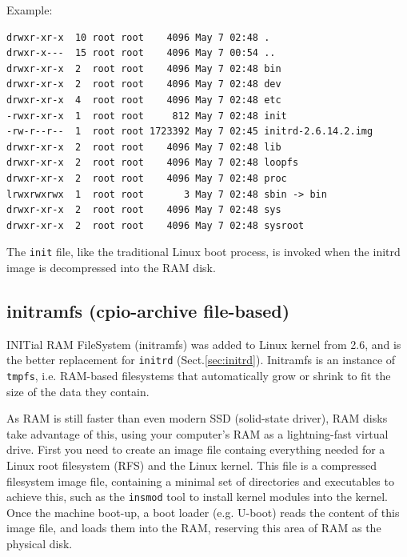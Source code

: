 Example: 
\begin{verbatim}
drwxr-xr-x  10 root root    4096 May 7 02:48 .
drwxr-x---  15 root root    4096 May 7 00:54 ..
drwxr-xr-x  2  root root    4096 May 7 02:48 bin
drwxr-xr-x  2  root root    4096 May 7 02:48 dev
drwxr-xr-x  4  root root    4096 May 7 02:48 etc
-rwxr-xr-x  1  root root     812 May 7 02:48 init
-rw-r--r--  1  root root 1723392 May 7 02:45 initrd-2.6.14.2.img
drwxr-xr-x  2  root root    4096 May 7 02:48 lib
drwxr-xr-x  2  root root    4096 May 7 02:48 loopfs
drwxr-xr-x  2  root root    4096 May 7 02:48 proc
lrwxrwxrwx  1  root root       3 May 7 02:48 sbin -> bin
drwxr-xr-x  2  root root    4096 May 7 02:48 sys
drwxr-xr-x  2  root root    4096 May 7 02:48 sysroot
\end{verbatim}
The \verb!init! file, like the traditional Linux boot process, is invoked when
the initrd image is decompressed into the RAM disk. 

%   

\subsection{initramfs (cpio-archive file-based)}
\label{sec:initramfs}

INITial RAM FileSystem (initramfs) was added to Linux kernel from 2.6, and is
the better replacement for \verb!initrd! (Sect.\ref{sec:initrd}).
Initramfs is an instance of \verb!tmpfs!, i.e. RAM-based filesystems that
automatically grow or shrink to fit the size of the data they contain.

\begin{mdframed}
As RAM is still faster than even modern SSD (solid-state driver), RAM disks take
advantage of this, using your computer's RAM as a lightning-fast virtual drive.
First you need to create an image file containg everything needed for a Linux
root filesystem (RFS) and the Linux kernel.
This file is a compressed filesystem image file, containing a minimal set of
directories and executables to achieve this, such as the \verb!insmod! tool to
install kernel modules into the kernel.
Once the machine boot-up, a boot loader (e.g. U-boot) reads the content of this
image file, and loads them into the RAM, reserving this area of RAM as the
physical disk.
\end{mdframed}

